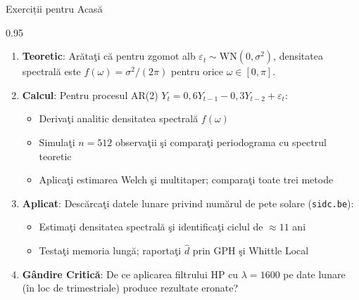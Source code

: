 \documentclass[9pt, aspectratio=169, t]{beamer}
\begin{document}
\begin{frame}{Exerciții pentru Acasă}
    \begin{cminipage}{0.95\textwidth}
    {\footnotesize
    \begin{enumerate}\setlength{\itemsep}{2pt}
        \item \textbf{Teoretic}: Arătaţi că pentru zgomot alb $\varepsilon_t \sim \mathrm{WN}(0,\sigma^2)$, densitatea spectrală este $f(\omega) = \sigma^2/(2\pi)$ pentru orice $\omega \in [0,\pi]$.

        \item \textbf{Calcul}: Pentru procesul AR(2) $Y_t = 0{,}6Y_{t-1} - 0{,}3Y_{t-2} + \varepsilon_t$:
            \begin{itemize}\setlength{\itemsep}{0pt}
                \item Derivaţi analitic densitatea spectrală $f(\omega)$
                \item Simulaţi $n = 512$ observaţii şi comparaţi periodograma cu spectrul teoretic
                \item Aplicaţi estimarea Welch şi multitaper; comparaţi toate trei metode
            \end{itemize}

        \item \textbf{Aplicat}: Descărcaţi datele lunare privind numărul de pete solare (\texttt{sidc.be}):
            \begin{itemize}\setlength{\itemsep}{0pt}
                \item Estimaţi densitatea spectrală şi identificaţi ciclul de $\approx 11$ ani
                \item Testaţi memoria lungă; raportaţi $\hat{d}$ prin GPH şi Whittle Local
            \end{itemize}

        \item \textbf{Gândire Critică}: De ce aplicarea filtrului HP cu $\lambda = 1600$ pe date lunare (în loc de trimestriale) produce rezultate eronate?
    \end{enumerate}
    }
    \end{cminipage}
\end{frame}
\end{document}
